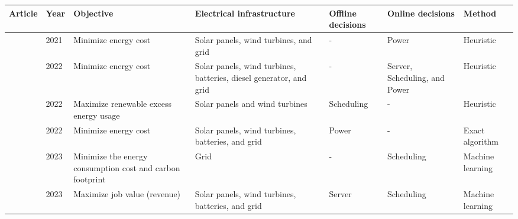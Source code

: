 \begin{landscape}
\begin{table*}[htp]
\centering
\begin{tabular}{m{3cm}|m{0.8cm}|m{3cm}|m{3.2cm}|m{3cm}|m{3cm}|m{3cm}}
\hline
Article & Year & Objective & Electrical infrastructure & Offline decisions & Online decisions & Method \\ \hline\hline
\citeauthor{he2022online} \cite{he2022online} & 2021 & Minimize energy cost & Solar panels, wind turbines, and grid & - & Power & Heuristic \\ \hline
\citeauthor{peng2022energy} \cite{peng2022energy} & 2022 & Minimize energy cost & Solar panels, wind turbines, batteries, diesel generator, and grid & - & Server, Scheduling, and Power & Heuristic \\ \hline
\citeauthor{wiesner2022cucumber} \cite{wiesner2022cucumber} & 2022 & Maximize renewable excess energy usage & Solar panels and wind turbines & Scheduling & - & Heuristic \\ \hline
\citeauthor{yuan2022optimal} \cite{yuan2022optimal} & 2022 & Minimize energy cost & Solar panels, wind turbines, batteries, and grid & Power & - & Exact algorithm \\ \hline
\citeauthor{liu2023online} \cite{liu2023online} & 2023 & Minimize the energy consumption cost and carbon footprint & Grid & - & Scheduling & Machine learning \\ \hline
\citeauthor{venkataswamy2023rare} \cite{venkataswamy2023rare} & 2023 & Maximize job value (revenue) & Solar panels, wind turbines, batteries, and grid  & Server & Scheduling & Machine learning \\ \hline

\end{tabular}
\end{table*}

\end{landscape}
